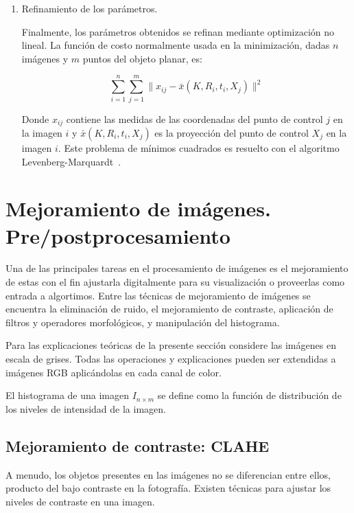 \begin{enumerate}
	\item Refinamiento de los parámetros.
	
	Finalmente, los parámetros obtenidos se refinan mediante optimización no lineal. La función de costo normalmente usada en la minimización, dadas $n$ imágenes y $m$ puntos del objeto planar, es:
	
	\begin{equation}
		\sum_{i=1}^n\sum_{j=1}^m \|x_{ij} - \bar{x}(K, R_i, t_i, X_j)\|^2
	\end{equation}

	Donde $x_{ij}$ contiene las medidas de las coordenadas del punto de control $j$ en la imagen $i$ y $\bar{x}(K, R_i, t_i, X_j)$ es la proyección del punto de control $X_j$ en la imagen $i$. Este problema de mínimos cuadrados es resuelto con el algoritmo Levenberg-Marquardt~\cite{more1978levenberg}.
\end{enumerate}

\section{Mejoramiento de imágenes. Pre/postprocesamiento}\label{section:imgEnh}

Una de las principales tareas en el procesamiento de imágenes es el mejoramiento de estas con el fin ajustarla digitalmente para su visualización o proveerlas como entrada a algortimos. Entre las técnicas de mejoramiento de imágenes se encuentra la eliminación de ruido, el mejoramiento de contraste, aplicación de filtros y operadores morfológicos, y manipulación del histograma.

Para las explicaciones teóricas de la presente sección considere las imágenes en escala de grises. Todas las operaciones y explicaciones pueden ser extendidas a imágenes RGB aplicándolas en cada canal de color.

\begin{definition}
	El histograma de una imagen $I_{n \times m}$ se define como la función de distribución de los niveles de intensidad de la imagen.
\end{definition}

\subsection{Mejoramiento de contraste: CLAHE}

A menudo, los objetos presentes en las imágenes no se diferencian entre ellos, producto del bajo contraste en la fotografía. Existen técnicas para ajustar los niveles de contraste en una imagen.


